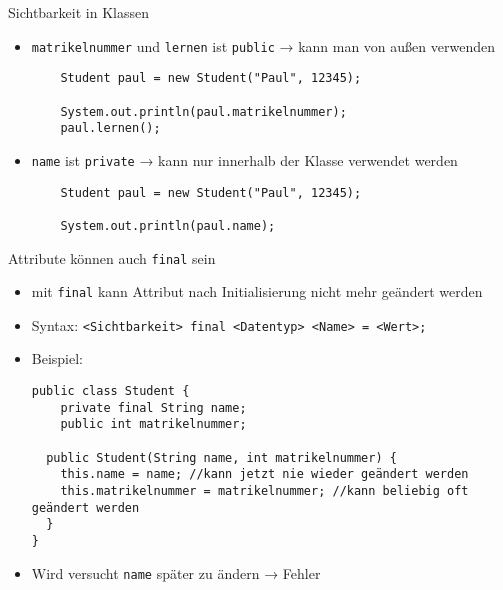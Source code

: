 \documentclass{../../presentation}
\begin{document}
\begin{frame}[fragile]{Sichtbarkeit in Klassen}

	\begin{itemize}

		\item<2-> \texttt{matrikelnummer} und \texttt{lernen} ist \texttt{public} → kann man von außen verwenden
		      \begin{verbatim}
    Student paul = new Student("Paul", 12345);

    System.out.println(paul.matrikelnummer);
    paul.lernen();
  \end{verbatim}
		\item<4-> \texttt{name} ist \texttt{private} → kann nur innerhalb der Klasse verwendet werden
		      \begin{verbatim}
    Student paul = new Student("Paul", 12345);

    System.out.println(paul.name);
  \end{verbatim}
	\end{itemize}
\end{frame}


\begin{frame}[fragile]{Attribute können auch \texttt{final} sein}

	\begin{itemize}
		\item<2-> mit \texttt{final} kann Attribut nach Initialisierung nicht mehr geändert werden
		\item<3-> Syntax: \texttt{<Sichtbarkeit> final <Datentyp> <Name> = <Wert>;}
		\item<4-> Beispiel:
		      \begin{verbatim}
public class Student {
    private final String name;
    public int matrikelnummer;
    
  public Student(String name, int matrikelnummer) {
    this.name = name; //kann jetzt nie wieder geändert werden
    this.matrikelnummer = matrikelnummer; //kann beliebig oft geändert werden
  }
}
\end{verbatim}

		\item<5-> Wird versucht \texttt{name} später zu ändern → \alert{Fehler}
	\end{itemize}

\end{frame}
\end{document}
